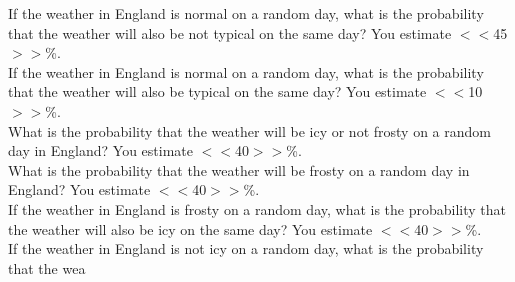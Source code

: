 \documentclass[pdflatex,sn-nature]{sn-jnl}%
\theoremstyle{thmstyleone}%
\theoremstyle{thmstyletwo}%
\theoremstyle{thmstylethree}%
\begin{document}
If the weather in England is normal on a random day, what is the probability that the weather will also be not typical on the same day? You estimate $<<$45$>>$\%. $~$\\ 
If the weather in England is normal on a random day, what is the probability that the weather will also be typical on the same day? You estimate $<<$10$>>$\%. $~$\\ 
What is the probability that the weather will be icy or not frosty on a random day in England? You estimate $<<$40$>>$\%. $~$\\ 
What is the probability that the weather will be frosty on a random day in England? You estimate $<<$40$>>$\%. $~$\\ 
If the weather in England is frosty on a random day, what is the probability that the weather will also be icy on the same day? You estimate $<<$40$>>$\%. $~$\\ 
If the weather in England is not icy on a random day, what is the probability that the wea 
\end{document}
